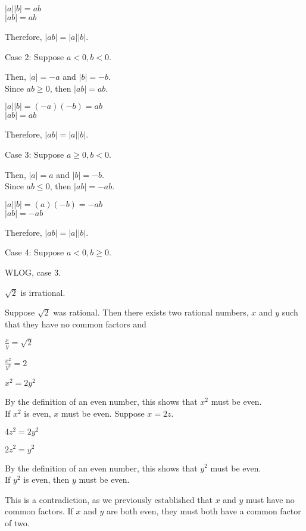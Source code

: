 \documentclass{exam}
\begin{document}
\begin{questions}
\begin{subparts}
\begin{center}
\( |a||b| = ab \)\\
\( |ab| = ab \)

Therefore, \( |ab| = |a||b| \).
\vspace{5mm}

Case 2: Suppose \(a < 0, b < 0 \).

Then, \(|a| = -a\) and \(|b| = -b\).\\
Since \( ab \geq 0 \), then \( |ab| = ab \).

\( |a||b| = (-a)(-b) = ab \)\\
\( |ab| = ab \)

Therefore, \( |ab| = |a||b| \).
\vspace{5mm}

Case 3: Suppose \( a \geq 0, b < 0 \).

Then, \(|a| = a\) and \(|b| = -b\).\\
Since \( ab \leq 0 \), then \( |ab| = -ab \).

\( |a||b| = (a)(-b) = -ab \)\\
\( |ab| = -ab \)

Therefore, \( |ab| = |a||b| \).
\vspace{5mm}

Case 4: Suppose \( a < 0, b \geq 0 \).

WLOG, case 3.

\end{center}

\subpart \( \sqrt{2} \) is irrational.

\begin{center}

Suppose \(\sqrt{2}\) was rational. Then there exists two rational numbers, \(x\) and \(y\) such that they have no common factors and

\(\frac{x}{y} = \sqrt{2}\)

\(\frac{x^2}{y^2} = 2\)

\(x^2 = 2y^2\)

By the definition of an even number, this shows that \(x^2\) must be even.\\
If \(x^2\) is even, \(x\) must be even. Suppose \(x = 2z\).

\(4z^2 = 2y^2\)

\(2z^2 = y^2\)

By the definition of an even number, this shows that \(y^2\) must be even.\\
If \(y^2\) is even, then \(y\) must be even.

This is a contradiction, as we previously established that \(x\) and \(y\) must have no common factors. If \(x\) and \(y\) are both even, they must both have a common factor of two.


\end{center}
\end{subparts}
\end{questions}
\end{document}
